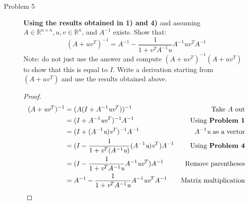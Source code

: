 \documentclass{article}
\begin{document}
\begin{description}
	\item[Problem 5] \textbf{Using the results obtained in 1) and 4)} and assuming $A \in \mathbb{R}^{n\times n}, \textit{u}, \textit{v} \in \mathbb{R}^n$, and $A^{-1}$ exists. Show that:
	      $$ (A+\textit{u}\textit{v}^T)^{-1} = A^{-1} - \frac{1}{1 + \textit{v}^TA^{-1}\textit{u}}A^{-1}\textit{u}\textit{v}^TA^{-1}$$
	      Note: do not just use the answer and compute $(A+\textit{u}\textit{v}^T)^{-1}(A+\textit{u}\textit{v}^T)$ to show that
	      this is equal to $I$. Write a derivation starting from
	      $(A + \textit{u}\textit{v}^T)$ and use the results obtained above.
	      \begin{proof}
		      \begin{align*}
			      (A + \textit{u}\textit{v}^T)^{-1}
			       & = (A(I + A^{-1}\textit{u}\textit{v}^T))^{-1}                                             & \text{Take $A$ out}                   & \\
			       & = (I + A^{-1}\textit{u}\textit{v}^T)^{-1}A^{-1}                                          & \text{Using \textbf{Problem 1}}       & \\
			       & = (I + (A^{-1}\textit{u})\textit{v}^T)^{-1}A^{-1}                                        & \text{$A^{-1}\textit{u}$ as a vector} & \\
			       & = (I - \frac{1}{1 + \textit{v}^T(A^{-1}\textit{u})}(A^{-1}\textit{u})\textit{v}^T)A^{-1} & \text{Using \textbf{Problem 4}}       & \\
			       & = (I - \frac{1}{1 + \textit{v}^TA^{-1}\textit{u}}A^{-1}\textit{u}\textit{v}^T)A^{-1}     & \text{Remove parentheses}             & \\
			       & = A^{-1} - \frac{1}{1 + \textit{v}^TA^{-1}\textit{u}}A^{-1}\textit{u}\textit{v}^TA^{-1}  & \text{Matrix multiplication}          &
		      \end{align*}
	      \end{proof}
\end{description}
\end{document}
